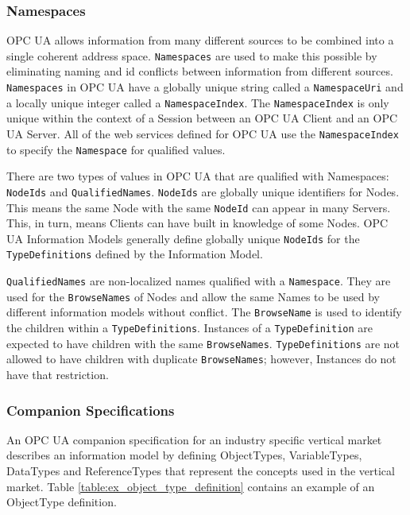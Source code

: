 \documentclass{mtconnect}	%
\begin{document}
\subsubsection{Namespaces}

OPC UA allows information from many different sources to be combined into a single coherent address space. \texttt{Namespaces} are used to make this possible by eliminating naming and id conflicts between information from different sources. \texttt{Namespaces} in OPC UA have a globally unique string called a \texttt{NamespaceUri} and a locally unique integer called a \texttt{NamespaceIndex}. The \texttt{NamespaceIndex} is only unique within the context of a Session between an OPC UA Client and an OPC UA Server. All of the web services defined for OPC UA use the \texttt{NamespaceIndex} to specify the \texttt{Namespace} for qualified values.

There are two types of values in OPC UA that are qualified with Namespaces: \texttt{NodeIds} and \texttt{QualifiedNames}. \texttt{NodeIds} are globally unique identifiers for Nodes. This means the same Node with the same \texttt{NodeId} can appear in many Servers. This, in turn, means Clients can have built in knowledge of some Nodes. OPC UA Information Models generally define globally unique \texttt{NodeIds} for the \texttt{TypeDefinitions} defined by the Information Model.

\texttt{QualifiedNames} are non-localized names qualified with a \texttt{Namespace}. They are used for the \texttt{BrowseNames} of Nodes and allow the same Names to be used by different information models without conflict. The \texttt{BrowseName} is used to identify the children within a \texttt{TypeDefinitions}. Instances of a \texttt{TypeDefinition} are expected to have children with the same \texttt{BrowseNames}. \texttt{TypeDefinitions} are not allowed to have children with duplicate \texttt{BrowseNames}; however, Instances do not have that restriction.

\subsubsection{Companion Specifications}

An OPC UA companion specification for an industry specific vertical market describes an information model by defining ObjectTypes, VariableTypes, DataTypes and ReferenceTypes that represent the concepts used in the vertical market. Table \ref{table:ex_object_type_definition} contains an example of an ObjectType definition.
\end{document}
